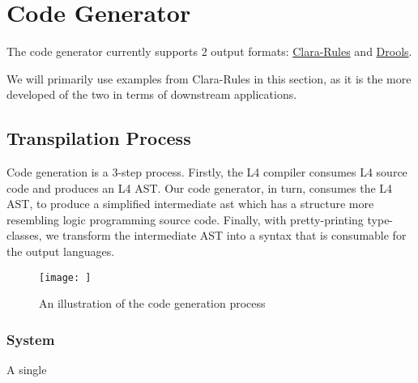 \section{Code Generator}

The code generator currently supports 2 output formats: \href{http://www.clara-rules.org/}{Clara-Rules}
and \href{https://docs.jboss.org/drools/release/7.58.0.Final/drools-docs/html_single/}{Drools}.

We will primarily use examples from Clara-Rules in this section, as it is the more developed of the two in terms of downstream applications.

\subsection{Transpilation Process}

Code generation is a 3-step process. Firstly, the L4 compiler consumes L4 source code and produces an L4 AST. Our code generator, in turn, consumes the L4 AST, to produce a simplified intermediate ast which has a structure more resembling logic programming source code. Finally, with pretty-printing type-classes, we transform the intermediate AST into a syntax that is consumable for the output languages.


\begin{figure}
    \centering
    \texttt{[image: ]}
    \caption{An illustration of the code generation process}
    \label{fig:code_generation_process}
\end{figure}


\subsubsection{System}

A single 



